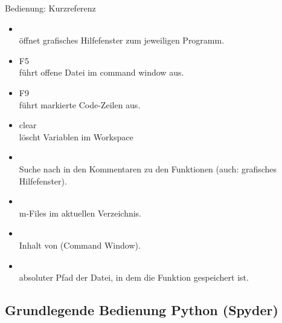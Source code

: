 \documentclass[hyperref={xetex}]{beamer}
\begin{document}
\begin{frame}[fragile]{Bedienung: Kurzreferenz}
\begin{itemize}
\item \alert{ }\\ öffnet grafisches Hilfefenster zum jeweiligen Programm.
  \item \alert{F5}\\ führt offene Datei im command window aus.
  \item \alert{F9}\\ führt markierte Code-Zeilen aus.
  \item \alert{clear}\\ löscht Variablen im Workspace
\item \alert{ } \\ Suche nach  in den
  Kommentaren zu den Funktionen (auch: grafisches Hilfefenster).
\item  \alert{ }\\ m-Files im aktuellen Verzeichnis.
\item  \alert{ }\\ Inhalt von  (Command Window).
\item  \alert{ }\\ absoluter Pfad der Datei, in dem die  Funktion
   gespeichert ist. 
\end{itemize}
\end{frame}


\subsection{Grundlegende Bedienung Python (Spyder)}
\end{document}
